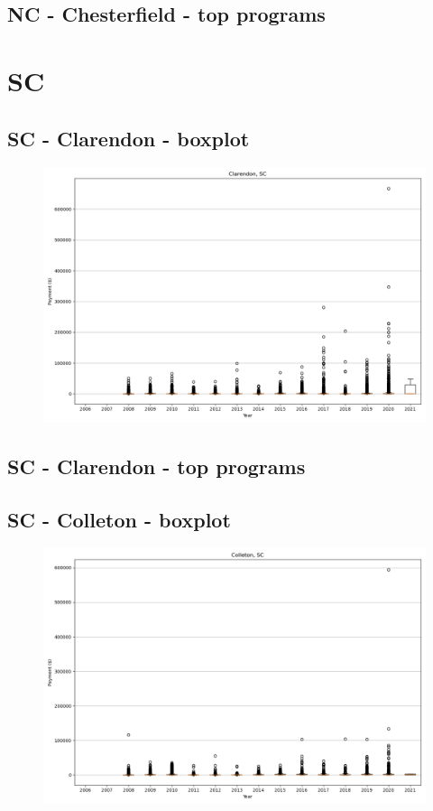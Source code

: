 \subsection*{NC - Chesterfield - top programs}

\newpage
\section*{SC}
\subsection*{SC - Clarendon - boxplot}
\begin{figure}[h]
\centering
\includegraphics[width=7in]{../output/boxplots/counties/Clarendon-SC_boxplot.png}
\end{figure}


\subsection*{SC - Clarendon - top programs}

\newpage
\subsection*{SC - Colleton - boxplot}
\begin{figure}[h]
\centering
\includegraphics[width=7in]{../output/boxplots/counties/Colleton-SC_boxplot.png}
\end{figure}


